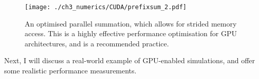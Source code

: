 \begin{figure}
    \centering
    \texttt{[image: ./ch3\_numerics/CUDA/prefixsum\_2.pdf]}
    \caption{An optimised parallel summation, which allows for strided memory access. This is a highly effective performance optimisation for GPU architectures, and is a recommended practice.}
    \label{fig:prefixsum2}
\end{figure}

Next, I will discuss a real-world example of GPU-enabled simulations, and offer some realistic performance measurements.

